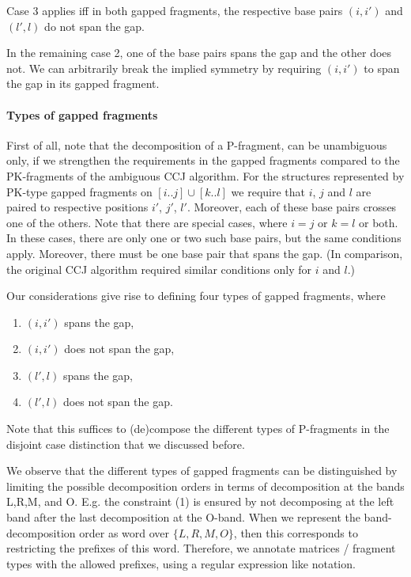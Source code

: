 \documentclass[11pt]{article} %
\begin{document}
Case 3 applies iff in both gapped fragments, the respective base pairs $(i,i')$ and $(l',l)$ do not span the gap.

In the remaining case 2, one of the base pairs spans the gap and the other does
not. We can arbitrarily break the implied symmetry by requiring $(i,i')$ to
span the gap in its gapped fragment.

\paragraph{Types of gapped fragments}

First of all, note that the decomposition of a P-fragment, can be unambiguous
only, if we strengthen the requirements in the gapped fragments compared to the
PK-fragments of the ambiguous CCJ algorithm.  For the structures represented by
PK-type gapped fragments on $[i..j]\cup[k..l]$ we require that $i$, $j$ and $l$
are paired to respective positions $i'$, $j'$, $l'$. Moreover, each of these
base pairs crosses one of the others.  Note that there are special
cases, where $i=j$ or $k=l$ or both. In these cases, there are only one or two
such base pairs, but the same conditions apply. Moreover, there must be one
base pair that spans the gap. (In comparison, the original CCJ algorithm
required similar conditions only for $i$ and $l$.)

Our considerations give rise to defining four types of gapped
fragments, where
\begin{enumerate}
\item $(i,i')$ spans the gap,
\item $(i,i')$ does not span the gap,
\item $(l',l)$ spans the gap,
\item $(l',l)$ does not span the gap.
\end{enumerate}

Note that this suffices to (de)compose the different types of P-fragments in
the disjoint case distinction that we discussed before.

We observe that the different types of gapped fragments can be distinguished by limiting
the possible decomposition orders in terms of decomposition at the bands L,R,M, and O.
E.g. the constraint (1) is ensured by not decomposing at the left band after the last decomposition at the O-band.
When we represent the band-decomposition order as word over $\{L,R,M,O\}$, then this corresponds to restricting the prefixes of this word. Therefore, we annotate matrices / fragment types with the allowed prefixes, using a regular expression like notation.
\end{document}
